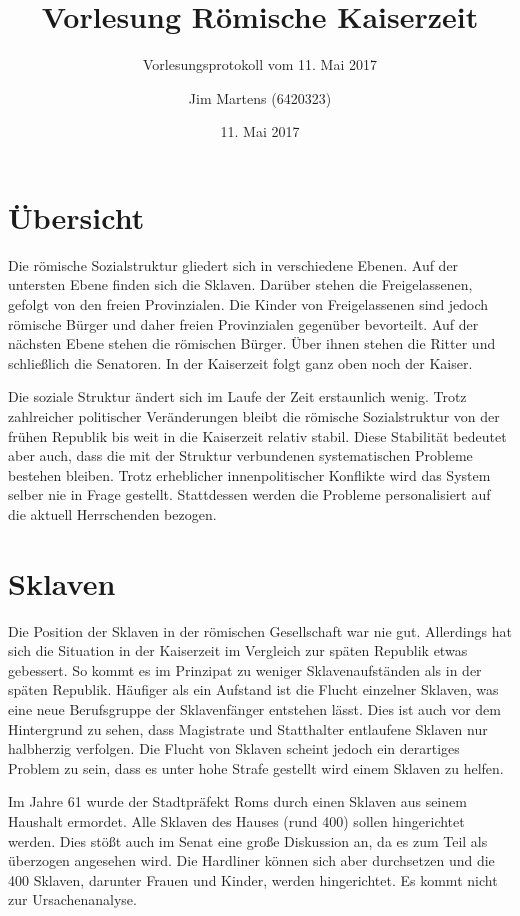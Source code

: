 \documentclass[10pt,a4paper,oneside,ngerman,numbers=noenddot]{scrartcl}
\begin{document}
\author{Jim Martens (6420323)}
\title{Vorlesung Römische Kaiserzeit}
\subtitle{Vorlesungsprotokoll vom 11. Mai 2017}
\date{11. Mai 2017}
\maketitle

\section*{Übersicht}

Die römische Sozialstruktur gliedert sich in verschiedene Ebenen. Auf der
untersten Ebene finden sich die Sklaven. Darüber stehen die Freigelassenen,
gefolgt von den freien Provinzialen. Die Kinder von Freigelassenen sind jedoch
römische Bürger und daher freien Provinzialen gegenüber bevorteilt.
Auf der nächsten Ebene stehen die römischen Bürger. Über ihnen stehen die
Ritter und schließlich die Senatoren. In der Kaiserzeit folgt ganz oben noch
der Kaiser.

Die soziale Struktur ändert sich im Laufe der Zeit erstaunlich wenig. Trotz
zahlreicher politischer Veränderungen bleibt die römische Sozialstruktur
von der frühen Republik bis weit in die Kaiserzeit relativ stabil. Diese
Stabilität bedeutet aber auch, dass die mit der Struktur verbundenen
systematischen Probleme bestehen bleiben. Trotz erheblicher innenpolitischer
Konflikte wird das System selber nie in Frage gestellt. Stattdessen werden
die Probleme personalisiert auf die aktuell Herrschenden bezogen.

\section*{Sklaven}

Die Position der Sklaven in der römischen Gesellschaft war nie gut. Allerdings
hat sich die Situation in der Kaiserzeit im Vergleich zur späten Republik
etwas gebessert. So kommt es im Prinzipat zu weniger Sklavenaufständen als
in der späten Republik. Häufiger als ein Aufstand ist die Flucht einzelner
Sklaven, was eine neue Berufsgruppe der Sklavenfänger entstehen lässt.
Dies ist auch vor dem Hintergrund zu sehen, dass Magistrate und Statthalter
entlaufene Sklaven nur halbherzig verfolgen.
Die Flucht von Sklaven scheint jedoch ein derartiges Problem zu sein, dass
es unter hohe Strafe gestellt wird einem Sklaven zu helfen.

Im Jahre 61 wurde der Stadtpräfekt Roms durch einen Sklaven aus seinem Haushalt
ermordet. Alle Sklaven des Hauses (rund 400) sollen hingerichtet werden. Dies
stößt auch im Senat eine große Diskussion an, da es zum Teil als überzogen
angesehen wird. Die Hardliner können sich aber durchsetzen und die 400 Sklaven,
darunter Frauen und Kinder, werden hingerichtet. Es kommt nicht zur
Ursachenanalyse.
\end{document}
